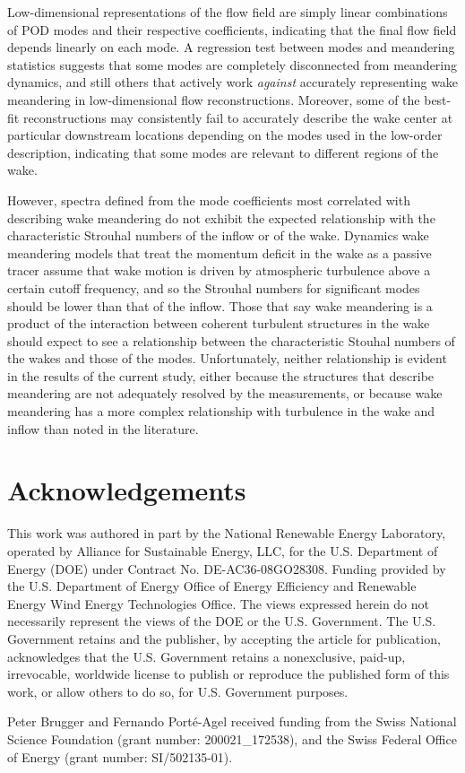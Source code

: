 \documentclass[%
 aip,
 amsmath,amssymb,
preprint,%
]{revtex4-1}
\begin{document}
Low-dimensional representations of the flow field are simply linear combinations of POD modes and their respective coefficients, indicating that the final flow field depends linearly on each mode.
A regression test between modes and meandering statistics suggests that some modes are completely disconnected from meandering dynamics, and still others that actively work \emph{against} accurately representing wake meandering in low-dimensional flow reconstructions.
Moreover, some of the best-fit reconstructions may consistently fail to accurately describe the wake center at particular downstream locations depending on the modes used in the low-order description, indicating that some modes are relevant to different regions of the wake.

However, spectra defined from the mode coefficients most correlated with describing wake meandering do not exhibit the expected relationship with the characteristic Strouhal numbers of the inflow or of the wake.
Dynamics wake meandering models that treat the momentum deficit in the wake as a passive tracer assume that wake motion is driven by atmospheric turbulence above a certain cutoff frequency, and so the Strouhal numbers for significant modes should be lower than that of the inflow.
Those that say wake meandering is a product of the interaction between coherent turbulent structures in the wake should expect to see a relationship between the characteristic Stouhal numbers of the wakes and those of the modes.
Unfortunately, neither relationship is evident in the results of the current study, either because the structures that describe meandering are not adequately resolved by the measurements, or because wake meandering has a more complex relationship with turbulence in the wake and inflow than noted in the literature.





\section*{Acknowledgements}

This work was authored in part by the National Renewable Energy Laboratory, operated by Alliance for Sustainable Energy, LLC, for the U.S. Department of Energy (DOE) under Contract No. DE-AC36-08GO28308. Funding provided by the U.S. Department of Energy Office of Energy Efficiency and Renewable Energy Wind Energy Technologies Office. The views expressed herein do not necessarily represent the views of the DOE or the U.S. Government. The U.S. Government retains and the publisher, by accepting the article for publication, acknowledges that the U.S. Government retains a nonexclusive, paid-up, irrevocable, worldwide license to publish or reproduce the published form of this work, or allow others to do so, for U.S. Government purposes. 

Peter Brugger and Fernando Porté-Agel received funding from the Swiss National Science Foundation (grant number: 200021\_172538), and the Swiss Federal Office of Energy (grant number: SI/502135-01).


\end{document}
